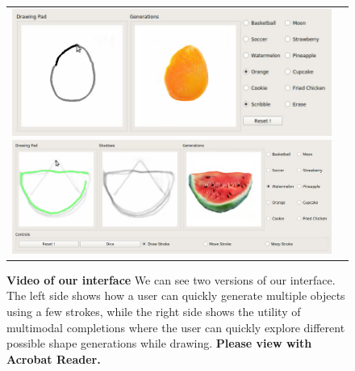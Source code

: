 
\begin{figure}[t]
    \centering  
    \begin{tabular}{cc}
    \includegraphics[width=.45\linewidth]{images/gif/00001.jpg} \hspace{4pt}
    \includegraphics[width=.45\linewidth]{images/gif_shadow/00001.jpg} 
    
    \\
    \end{tabular}
        \caption{{\bf Video of our interface} We can see two versions of our interface. The left side shows how a user can quickly generate multiple objects using a few strokes, while the right side shows the utility of multimodal completions where the user can quickly explore different possible shape generations while drawing.
        { \textbf{Please view with Acrobat Reader.}}}\label{fig:gui}
\end{figure}


